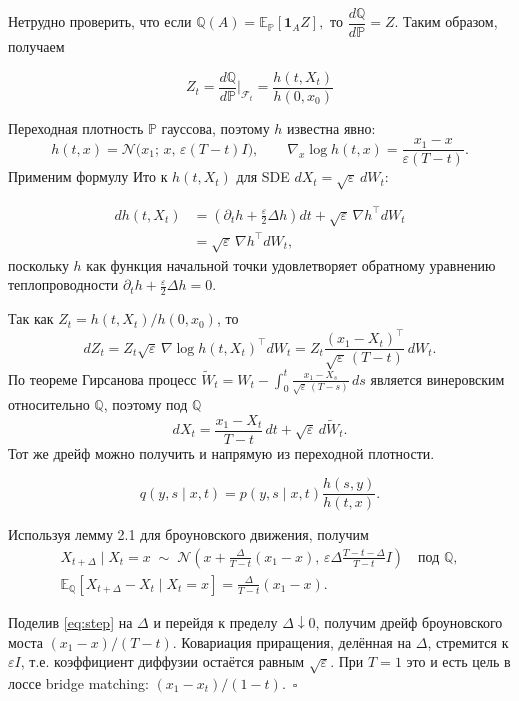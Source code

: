 \documentclass[a4paper, 12pt]{article}
\begin{document}
Нетрудно проверить, что если \(
\mathbb Q(A)=\mathbb E_{\mathbb P}[\mathbf 1_A Z],
\)
то $\dfrac{d\mathbb{Q}}{d\mathbb{P}} = Z$. Таким образом, получаем 

\begin{equation}
  Z_t = \frac{d\mathbb{Q}}{d\mathbb{P}} \bigg\vert_{\mathcal{F}_t} = \frac{h(t, X_t)}{h(0, x_0)}
\end{equation}

Переходная плотность $\mathbb{P}$ гауссова, поэтому $h$ известна явно:
\[
h(t, x) = \mathcal N\big(x_1;\, x,\, \varepsilon (T - t) I\big),
\qquad
\nabla_x \log h(t, x) = \frac{x_1 - x}{\varepsilon (T - t)}.
\]
Применим формулу Ито к $h(t, X_t)$ для SDE $dX_t = \sqrt\varepsilon\, dW_t$:

\[
\begin{aligned}
  dh(t, X_t) &= \left(\partial_t h + \frac{\varepsilon}{2} \Delta h\right) dt + \sqrt\varepsilon\, \nabla h^\top dW_t \\&= \sqrt\varepsilon\, \nabla h^\top dW_t,
\end{aligned}
\]
поскольку $h$ как функция начальной точки удовлетворяет обратному уравнению теплопроводности $\partial_t h + \frac{\varepsilon}{2} \Delta h = 0$.

Так как $Z_t = h(t, X_t) / h(0, x_0)$, то
\[
dZ_t = Z_t \sqrt\varepsilon\, \nabla \log{h(t, X_t)}^\top dW_t = Z_t \frac{(x_1 - X_t)^\top}{\sqrt\varepsilon\,(T-t)}\, dW_t.
\]
По теореме Гирсанова процесс $\widetilde W_t = W_t - \int_0^t \frac{x_1 - X_s}{\sqrt\varepsilon\,(T-s)}\, ds$ является винеровским относительно $\mathbb{Q}$, поэтому под $\mathbb{Q}$
\[
dX_t = \frac{x_1 - X_t}{T - t}\, dt + \sqrt\varepsilon\, d\widetilde W_t.
\]
Тот же дрейф можно получить и напрямую из переходной плотности.

\begin{lemma}
  \[
q(y,s\mid x,t)
=
p(y,s\mid x,t)\frac{h(s,y)}{h(t,x)}.
\]
\end{lemma}

Используя лемму 2.1 для броуновского движения, получим
\begin{equation}\label{eq:step}
\begin{gathered}
  X_{t + \Delta} \mid X_t = x \;\sim\; \mathcal{N}\left( x + \frac{\Delta}{T-t} (x_1 - x), \, \varepsilon \Delta \frac{T - t - \Delta}{T - t} I \right) \quad \text{под } \mathbb{Q}, \\
  \mathbb{E}_\mathbb{Q} \left[ X_{t + \Delta} - X_t \mid X_t = x \right] = \frac{\Delta}{T - t} (x_1 - x).
\end{gathered}
\end{equation}

Поделив \eqref{eq:step} на $\Delta$ и перейдя к пределу $\Delta \downarrow 0$, получим дрейф броуновского моста $(x_1 - x)/(T - t)$. Ковариация приращения, делённая на $\Delta$, стремится к $\varepsilon I$, т.е. коэффициент диффузии остаётся равным $\sqrt\varepsilon$. При $T = 1$ это и есть цель в лоссе bridge matching: $(x_1 - x_t)/(1 - t)$.~$\square$
\end{document}

